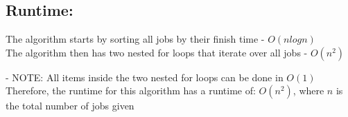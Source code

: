 \documentclass[11pt]{article}
\begin{document}
\subsection*{Runtime:}
The algorithm starts by sorting all jobs by their finish time - $O(nlogn)$\\
The algorithm then has two nested for loops that iterate over all jobs - $O(n^2)$

- NOTE: All items inside the two nested for loops can be done in $O(1)$\\

\noindent Therefore, the runtime for this algorithm has a runtime of: $O(n^2)$, where $n$ is the total number of jobs given
\end{document}
